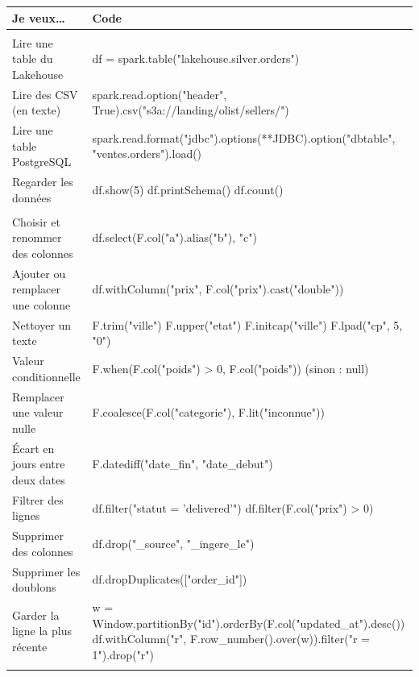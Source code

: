 \documentclass[11pt,a4paper]{article}
\begin{document}
\begin{center}
\small
\renewcommand{\arraystretch}{1.22}
\begin{tabularx}{\textwidth}{@{}>{\raggedright\arraybackslash}p{4.1cm} >{\raggedright\arraybackslash\ttfamily\footnotesize}X@{}}
\toprule
\normalfont\textbf{Je veux\dots} & \normalfont\textbf{Code} \\
\midrule
\multicolumn{2}{@{}l}{\textbf{\textcolor{lhblue}{Lire}}} \\
Lire une table du Lakehouse & df = spark.table("lakehouse.silver.orders") \\
Lire des CSV (en texte) & spark.read.option("header", True).csv("s3a://landing/olist/sellers/") \\
Lire une table PostgreSQL & spark.read.format("jdbc").options(**JDBC).option("dbtable", "ventes.orders").load() \\
Regarder les données & df.show(5) \quad df.printSchema() \quad df.count() \\
\midrule
\multicolumn{2}{@{}l}{\textbf{\textcolor{lhblue}{Transformer}}} \\
Choisir et renommer des colonnes & df.select(F.col("a").alias("b"), "c") \\
Ajouter ou remplacer une colonne & df.withColumn("prix", F.col("prix").cast("double")) \\
Nettoyer un texte & F.trim("ville") \quad F.upper("etat") \quad F.initcap("ville") \quad F.lpad("cp", 5, "0") \\
Valeur conditionnelle & F.when(F.col("poids") > 0, F.col("poids")) \quad \textrm{(sinon : null)} \\
Remplacer une valeur nulle & F.coalesce(F.col("categorie"), F.lit("inconnue")) \\
Écart en jours entre deux dates & F.datediff("date\_fin", "date\_debut") \\
Filtrer des lignes & df.filter("statut = 'delivered'") \quad df.filter(F.col("prix") > 0) \\
Supprimer des colonnes & df.drop("\_source", "\_ingere\_le") \\
Supprimer les doublons & df.dropDuplicates(["order\_id"]) \\
Garder la ligne la plus récente & w = Window.partitionBy("id").orderBy(F.col("updated\_at").desc()) \newline
  df.withColumn("r", F.row\_number().over(w)).filter("r = 1").drop("r") \\
\midrule
\multicolumn{2}{@{}l}{\textbf{\textcolor{lhblue}{Combiner et agréger}}} \\

\end{tabularx}
\end{center}
\end{document}
